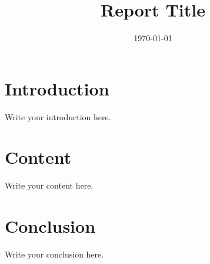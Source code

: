 \documentclass{report}
\title{Report Title}
\author{}
\date{\today}
\begin{document}
\maketitle

\chapter{Introduction}
Write your introduction here.

\chapter{Content}
Write your content here.

\chapter{Conclusion}
Write your conclusion here.
\end{document}
